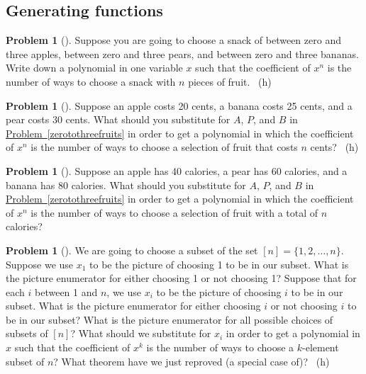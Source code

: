 \documentclass[10pt,]{book}
\theoremstyle{plain}
\theoremstyle{definition}
\newtheorem{activity}[project]{Problem}
\theoremstyle{definition}
\numberwithin{equation}{chapter}
\begin{document}
\subsection[{Generating functions}]{Generating functions}\label{subsection-42}
\begin{activity}[] \label{activity-183}
\hypertarget{p-1062}{}%
Suppose you are going to choose a snack of between zero and three apples, between zero and three pears, and between zero and three bananas. Write down a polynomial in one variable \(x\) such that the coefficient of \(x^n\) is the number of ways to choose a snack with \(n\) pieces of fruit.%
~{\tiny (h)}\end{activity}
\begin{activity}[] \label{activity-184}
\hypertarget{p-1065}{}%
Suppose an apple costs 20 cents, a banana costs 25 cents, and a pear costs 30 cents. What should you substitute for \(A\), \(P\), and \(B\) in \hyperref[zerotothreefruits]{Problem~\ref{zerotothreefruits}} in order to get a polynomial in which the coefficient of \(x^n\) is the number of ways to choose a selection of fruit that costs \(n\) cents?%
~{\tiny (h)}\end{activity}
\begin{activity}[] \label{activity-185}
\hypertarget{p-1068}{}%
Suppose an apple has 40 calories, a pear has 60 calories, and a banana has 80 calories. What should you substitute for \(A\), \(P\), and \(B\) in \hyperref[zerotothreefruits]{Problem~\ref{zerotothreefruits}} in order to get a polynomial in which the coefficient of \(x^n\) is the number of ways to choose a selection of fruit with a total of \(n\) calories?%
\end{activity}
\begin{activity}[] \label{reprovingbinomialtheorem}
\hypertarget{p-1070}{}%
We are going to choose a subset of the set \([n]=\{1,2,\ldots, n\}\). Suppose we use \(x_1\) to be the picture of choosing 1 to be in our subset. What is the picture enumerator for either choosing 1 or not choosing 1? Suppose that for each \(i\) between 1 and \(n\), we use \(x_i\) to be the picture of choosing \(i\) to be in our subset. What is the picture enumerator for either choosing \(i\) or not choosing \(i\) to be in our subset? What is the picture enumerator for all possible choices of subsets of \([n]\)? What should we substitute for \(x_i\) in order to get a polynomial in \(x\) such that the coefficient of \(x^k\) is the number of ways to choose a \(k\)-element subset of \(n\)? What theorem have we just reproved (a special case of)?%
~{\tiny (h)}\end{activity}
\end{document}
